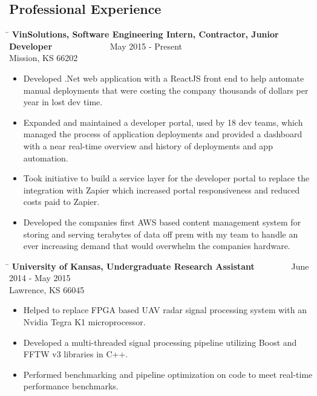 \documentclass{res}
\begin{document}
\begin{resume}
\section{Professional Experience}
   \vspace{-0.1in}	
   \begin{tabbing}
   \hspace{5.5in}\= \kill 
    {\bf VinSolutions, Software Engineering Intern, Contractor, Junior Developer} \>~~~~~~~~~~~~~May 2015 - Present\\
    Mission, KS 66202
   \end{tabbing}\vspace{-10pt}
	\begin{itemize}
		\item Developed .Net web application with a ReactJS front end to help automate manual deployments that were costing the company thousands of dollars per year in lost dev time.
		\item Expanded and maintained a developer portal, used by 18 dev teams, which managed the process of application deployments and provided a dashboard with a near real-time overview and history of deployments and app automation.
		\item Took initiative to build a service layer for the developer portal to replace the integration with Zapier which increased portal responsiveness and reduced costs paid to Zapier.
		\item Developed the companies first AWS based content management system for storing and serving terabytes of data off prem with my team to handle an ever increasing demand that would overwhelm the companies hardware. \vspace{-15pt}
	\end{itemize}
   \begin{tabbing}
   \hspace{5.5in}\= \kill
    {\bf University of Kansas, Undergraduate Research Assistant} \>~~~~~~~~June 2014 - May 2015\\
    Lawrence, KS 66045
   \end{tabbing}\vspace{-10pt}
	\begin{itemize}
		\item Helped to replace FPGA based UAV radar signal processing system with an Nvidia Tegra K1 microprocessor.
		\item Developed a multi-threaded signal processing pipeline utilizing Boost and FFTW v3 libraries in C++.
		\item Performed benchmarking and pipeline optimization on code to meet real-time performance benchmarks.\vspace{-15pt}

\end{itemize}
\end{resume}
\end{document}
